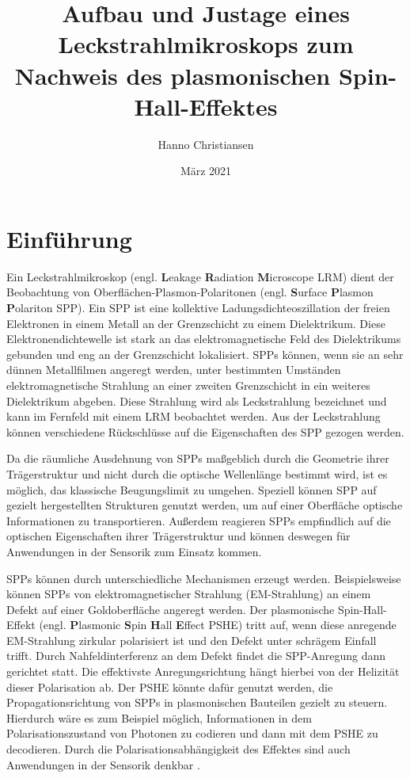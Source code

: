 \documentclass[a4paper, titlepage,  ngerman]{book}
\title{Aufbau und Justage eines Leckstrahlmikroskops zum Nachweis des plasmonischen Spin-Hall-Effektes}
\author{Hanno Christiansen}
\date{März 2021}
\begin{document}
	
	\sloppy
	\frontmatter
	
	\thispagestyle{empty}	
	\tableofcontents
	\listoffigures
	\enlargethispage{1.5\baselineskip}
	
	\mainmatter
	\chapter{Einführung}
	Ein Leckstrahlmikroskop (engl. \textbf{L}eakage \textbf{R}adiation \textbf{M}icroscope LRM) dient der Beobachtung von Oberflächen-Plasmon-Polaritonen (engl. \textbf{S}urface \textbf{P}lasmon \textbf{P}olariton SPP). Ein SPP ist eine kollektive Ladungsdichteoszillation der freien Elektronen in einem Metall an der Grenzschicht zu einem Dielektrikum. Diese Elektronendichtewelle ist stark an das elektromagnetische Feld des Dielektrikums gebunden und eng an der Grenzschicht lokalisiert. SPPs können, wenn sie an sehr dünnen Metallfilmen angeregt werden, unter bestimmten Umständen elektromagnetische Strahlung an einer zweiten Grenzschicht in ein weiteres Dielektrikum abgeben. Diese Strahlung wird als Leckstrahlung bezeichnet und kann im Fernfeld mit einem LRM beobachtet werden. Aus der Leckstrahlung können verschiedene Rückschlüsse auf die Eigenschaften des SPP gezogen werden.\cite{Drezet.2008}
	
	Da die räumliche Ausdehnung von SPPs maßgeblich durch die Geometrie ihrer Trägerstruktur und nicht durch die optische Wellenlänge bestimmt wird, ist es möglich, das klassische Beugungslimit zu umgehen. Speziell können SPP auf gezielt hergestellten Strukturen genutzt werden, um auf einer Oberfläche optische Informationen zu transportieren. Außerdem reagieren SPPs empfindlich auf die optischen Eigenschaften ihrer Trägerstruktur und können deswegen für Anwendungen in der Sensorik zum Einsatz kommen.\cite{Lin.2013}
	
	SPPs können durch unterschiedliche Mechanismen erzeugt werden. Beispielsweise können SPPs von elektromagnetischer Strahlung (EM-Strahlung) an einem Defekt auf einer Goldoberfläche angeregt werden. Der plasmonische Spin-Hall-Effekt (engl. \textbf{P}lasmonic \textbf{S}pin \textbf{H}all \textbf{E}ffect PSHE) tritt auf, wenn diese anregende EM-Strahlung zirkular polarisiert ist und den Defekt unter schrägem Einfall trifft. Durch Nahfeldinterferenz an dem Defekt findet die SPP-Anregung dann gerichtet statt. Die effektivste Anregungsrichtung hängt hierbei von der Helizität dieser Polarisation ab. Der PSHE könnte dafür genutzt werden, die Propagationsrichtung von SPPs in plasmonischen Bauteilen gezielt zu steuern. Hierdurch wäre es zum Beispiel möglich, Informationen in dem Polarisationszustand von Photonen zu codieren und dann mit dem PSHE zu decodieren. Durch die Polarisationsabhängigkeit des Effektes sind auch Anwendungen in der Sensorik denkbar \cite{RodriguezFortuno.2013}.
	
\end{document}
